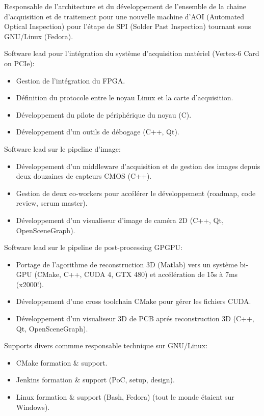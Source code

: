 \documentclass{article}
\begin{document}
\begin{llist}
{Responsable de l'architecture et du d\'{e}veloppement de l'ensemble de la chaine d'acquisition et de traitement
pour une nouvelle machine d'AOI (Automated Optical Inspection) pour l'\'{e}tape de SPI (Solder Past Inspection)
tournant sous GNU/Linux (Fedora).

Software lead pour l'int\'{e}gration du syst\`{e}me d'acquisition mat\'{e}riel (Vertex-6 Card on PCIe):
\vspace{-0.33cm}
\begin{itemize}
	\item Gestion de l'int\'{e}gration du FPGA.
	\item D\'{e}finition du protocole entre le noyau Linux et la carte d'acquisition.
	\item D\'{e}veloppement du pilote de p\'{e}riph\'{e}rique du noyau (C).
	\item D\'{e}veloppement d'un outils de d\'{e}bogage (C++, Qt).
\end{itemize}
Software lead sur le pipeline d'image:
\vspace{-0.33cm}
\begin{itemize}
	\item D\'{e}veloppement d'un middleware d'acquisition et de gestion des
		images depuis deux douzaines de capteurs CMOS (C++).
	\item Gestion de deux co-workers pour acc\'{e}l\'{e}rer le d\'{e}veloppement (roadmap, code review, scrum master).
	\item D\'{e}veloppement d'un visualiseur d'image de cam\'{e}ra 2D (C++, Qt, OpenSceneGraph).
\end{itemize}
Software lead sur le pipeline de post-processing GPGPU:
\vspace{-0.33cm}
\begin{itemize}
	\item Portage de l'agorithme de reconstruction 3D (Matlab) vers un syst\`{e}me bi-GPU (CMake, C++, CUDA 4, GTX 480)
		et acc\'{e}l\'{e}ration de 15s \`{a} 7ms (x2000!).
	\item D\'{e}veloppement d'une cross toolchain CMake pour g\'{e}rer les fichiers CUDA.
	\item D\'{e}veloppement d'un visualiseur 3D de PCB apr\'{e}s reconstruction 3D (C++, Qt, OpenSceneGraph).
\end{itemize}

Supports divers commme responsable technique sur GNU/Linux:
\vspace{-0.33cm}
\begin{itemize}
	\item CMake formation \& support.
	\item Jenkins formation \& support (PoC, setup, design).
	\item Linux formation \& support (Bash, Fedora) (tout le monde \'{e}taient sur Windows).
\end{itemize}
}


\end{llist}
\end{document}
